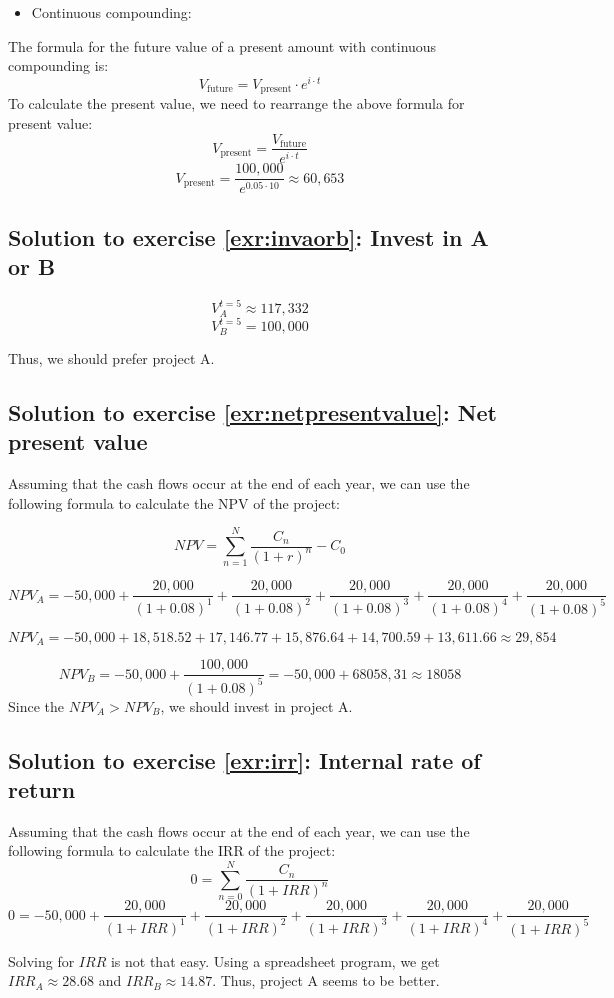 \documentclass[
  12pt,
  oneside]{book}
\providecommand{\tightlist}{%
  \setlength{\itemsep}{0pt}\setlength{\parskip}{0pt}}
\theoremstyle{definition}
\theoremstyle{definition}
\theoremstyle{definition}
\theoremstyle{definition}
\theoremstyle{remark}
\begin{document}
\begin{itemize}
\tightlist
\item
  Continuous compounding:
\end{itemize}

The formula for the future value of a present amount with continuous compounding is:
\[
V_{\text{future}} = V_{\text{present}} \cdot e^{i \cdot t}
\]
To calculate the present value, we need to rearrange the above formula for present value:
\[
V_{\text{present}}  = \frac{V_{\text{future}}}{e^{i\cdot t}}
\]
\[
V_{\text{present}} = \frac{100,000}{e^{0.05 \cdot 10}} \approx 60,653
\]

\hypertarget{sol:invaorb}{%
\subsection*{Solution to exercise \ref{exr:invaorb}: Invest in A or B}\label{sol:invaorb}}

\[
V_{A}^{t=5}\approx 117,332
\]
\[
V_{B}^{t=5}= 100,000
\]

Thus, we should prefer project A.

\hypertarget{sol:netpresentvalue}{%
\subsection*{Solution to exercise \ref{exr:netpresentvalue}: Net present value}\label{sol:netpresentvalue}}

Assuming that the cash flows occur at the end of each year, we can use the following formula to calculate the NPV of the project:

\[ 
NPV = \sum_{n=1}^{N} \frac{C_n}{(1+r)^n} - C_0 
\]

\[
NPV_A = -50,000 + \frac{20,000}{(1 + 0.08)^1} + 
    \frac{20,000 }{ (1 + 0.08)^2} + 
        \frac{20,000 }{ (1 + 0.08)^3} + 
            \frac{20,000 }{ (1 + 0.08)^4} + 
                \frac{20,000 }{ (1 + 0.08)^5}
\]

\[
NPV_A = -50,000 + 18,518.52 + 17,146.77 + 15,876.64 + 14,700.59 + 13,611.66 \approx 29,854
\]

\[
NPV_B = -50,000 + \frac{100,000 }{ (1 + 0.08)^5} = -50,000+68058,31\approx 18058
\]
Since the \(NPV_A>NPV_B\), we should invest in project A.

\hypertarget{sol:irr}{%
\subsection*{Solution to exercise \ref{exr:irr}: Internal rate of return}\label{sol:irr}}

Assuming that the cash flows occur at the end of each year, we can use the following formula to calculate the IRR of the project:
\[ 0 = \sum_{n=0}^{N} \frac{C_n}{(1+IRR)^n}  \]
\[
0 = -50,000 + 
\frac{20,000}{(1 + IRR)^1} 
+ \frac{20,000 }{ (1 + IRR)^2 }
+ \frac{20,000 }{ (1 + IRR)^3 }
+ \frac{20,000 }{ (1 + IRR)^4 }
+ \frac{20,000 }{ (1 + IRR)^5 }
\]

Solving for \(IRR\) is not that easy. Using a spreadsheet program, we get \(IRR_A\approx 28.68%
\) and \(IRR_B\approx 14.87%
\). Thus, project A seems to be better.

  
\end{document}

